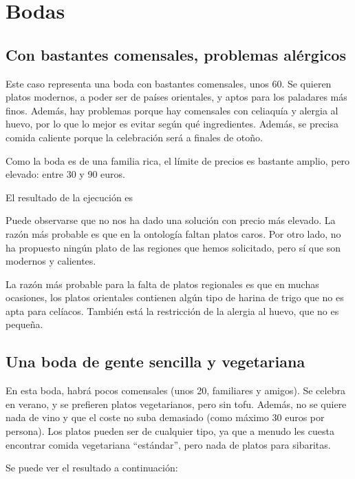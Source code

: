 % 

\section{Bodas}

\subsection{Con bastantes comensales, problemas alérgicos}
Este caso representa una boda con bastantes comensales, unos 60. Se quieren
platos modernos, a poder ser de países orientales, y aptos para los paladares
más finos. Además, hay problemas porque hay comensales con celiaquía y alergia
al huevo, por lo que lo mejor es evitar según qué ingredientes. Además, se
precisa comida caliente porque la celebración será a finales de otoño.

Como la boda es de una familia rica, el límite de precios es bastante amplio,
pero elevado: entre 30 y 90 euros.

El resultado de la ejecución es


Puede observarse que no nos ha dado una solución con precio más elevado. La
razón más probable es que en la ontología faltan platos caros. Por otro lado,
no ha propuesto ningún plato de las regiones que hemos solicitado, pero sí que
son modernos y calientes.

La razón más probable para la falta de platos regionales es que en muchas
ocasiones, los platos orientales contienen algún tipo de harina de trigo que no
es apta para celíacos. También está la restricción de la alergia al huevo, que
no es pequeña.

\subsection{Una boda de gente sencilla y vegetariana}
En esta boda, habrá pocos comensales (unos 20, familiares y amigos). Se celebra
en verano, y se prefieren platos vegetarianos, pero sin tofu. Además, no se
quiere nada de vino y que el coste no suba demasiado (como máximo 30 euros por
persona). Los platos pueden ser de cualquier tipo, ya que a menudo les cuesta
encontrar comida vegetariana ``estándar'', pero nada de platos para sibaritas.

Se puede ver el resultado a continuación:


